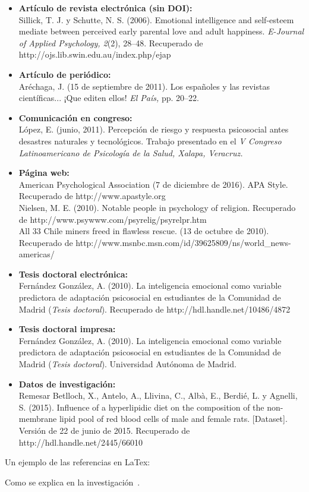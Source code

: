 {\begin{itemize}
  \item \textbf{Artículo de revista electrónica (sin DOI):}\\
  Sillick, T. J. y Schutte, N. S. (2006). Emotional intelligence and self-esteem mediate between perceived early parental love and adult happiness. \textit{E-Journal of Applied Psychology, 2}(2), 28--48. Recuperado de http://ojs.lib.swin.edu.au/index.php/ejap

  \item \textbf{Artículo de periódico:}\\
  Aréchaga, J. (15 de septiembre de 2011). Los españoles y las revistas científicas... ¡Que editen ellos! \textit{El País,} pp. 20--22.

  \item \textbf{Comunicación en congreso:}\\
  López, E. (junio, 2011). Percepción de riesgo y respuesta psicosocial antes desastres naturales y tecnológicos. Trabajo presentado en el \textit{V Congreso Latinoamericano de Psicología de la Salud, Xalapa, Veracruz.}

  \item \textbf{Página web:}\\
  American Psychological Association (7 de diciembre de 2016). APA Style. Recuperado de http://www.apastyle.org \\
  Nielsen, M. E. (2010). Notable people in psychology of religion. Recuperado de http://www.psywww.com/psyrelig/psyrelpr.htm \\
  All 33 Chile miners freed in flawless rescue. (13 de octubre de 2010). Recuperado de http://www.msnbc.msn.com/id/39625809/ns/world\_news-americas/

  \item \textbf{Tesis doctoral electrónica:}\\
  Fernández González, A. (2010). La inteligencia emocional como variable predictora de adaptación psicosocial en estudiantes de la Comunidad de Madrid (\textit{Tesis doctoral}). Recuperado de http://hdl.handle.net/10486/4872

  \item \textbf{Tesis doctoral impresa:}\\
  Fernández González, A. (2010). La inteligencia emocional como variable predictora de adaptación psicosocial en estudiantes de la Comunidad de Madrid (\textit{Tesis doctoral}). Universidad Autónoma de Madrid.

  \item \textbf{Datos de investigación:}\\
  Remesar Betlloch, X., Antelo, A., Llivina, C., Albà, E., Berdié, L. y Agnelli, S. (2015). Influence of a hyperlipidic diet on the composition of the non-membrane lipid pool of red blood cells of male and female rats. [Dataset]. Versión de 22 de junio de 2015. Recuperado de http://hdl.handle.net/2445/66010
\end{itemize}

Un ejemplo de las referencias en LaTex:

Como se explica en la investigación~\citep{sanchez2021}.
  
}